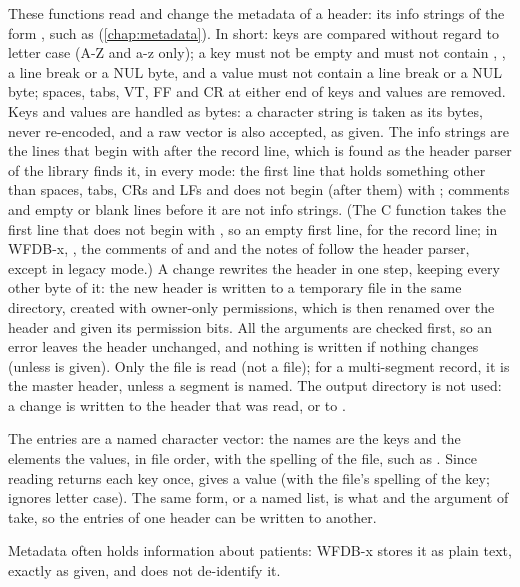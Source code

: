 These functions read and change the metadata of a header: its info strings of the form
, such as  (\cref{chap:metadata}). In short: keys are
compared without regard to letter case (A-Z and a-z only); a key must not be empty and
must not contain \code{:}, \code{\#}, a line break or a NUL byte, and a value must not
contain a line break or a NUL byte; spaces, tabs, VT, FF and CR at either end of keys and
values are removed. Keys and values are handled as bytes: a character string is taken as
its bytes, never re-encoded, and a raw vector is also accepted, as given. The info
strings are the lines that begin with \code{\#} after the record line, which is found as
the header parser of the library finds it, in every mode: the first line that holds
something other than spaces, tabs, CRs and LFs and does not begin (after them) with
\code{\#}; comments and empty or blank lines before it are not info strings. (The C
function  takes the first line that does not begin with \code{\#}, so an
empty first line, for the record line; in WFDB-x, , the comments of
 and  and the notes of  follow the
header parser, except in legacy mode.) A change rewrites the header in one step, keeping
every other byte of it: the new header is written to a temporary file in the same
directory, created with owner-only permissions, which is then renamed over the header
and given its permission bits. All the arguments are checked first, so an error leaves
the header unchanged, and nothing is written if nothing changes (unless  is
given). Only the  file is read (not a  file); for a multi-segment
record, it is the master header, unless a segment is named. The output directory is not
used: a change is written to the header that was read, or to .

The entries are a named character vector: the names are the keys and the elements the
values, in file order, with the spelling of the file, such as . Since reading returns each key once,  gives a value (with the
file's spelling of the key;  ignores letter case). The same form, or
a named list, is what  and the argument  of
 take, so the entries of one header can be written to another.

Metadata often holds information about patients: WFDB-x stores it as plain text, exactly
as given, and does not de-identify it.

